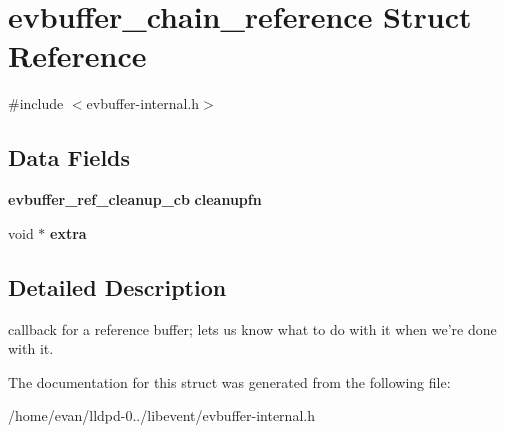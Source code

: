\section{evbuffer\-\_\-chain\-\_\-reference \-Struct \-Reference}
\label{structevbuffer__chain__reference}


{\ttfamily \#include $<$evbuffer-\/internal.\-h$>$}

\subsection*{\-Data \-Fields}
\begin{DoxyCompactItemize}
\item 
{\bf evbuffer\-\_\-ref\-\_\-cleanup\-\_\-cb} {\bfseries cleanupfn}\label{structevbuffer__chain__reference_a2202b563403be4aedf5864efc75ca02d}

\item 
void $\ast$ {\bfseries extra}\label{structevbuffer__chain__reference_a12b7a7182ccbd2e1bc5142e5caafe584}

\end{DoxyCompactItemize}


\subsection{\-Detailed \-Description}
callback for a reference buffer; lets us know what to do with it when we're done with it. 

\-The documentation for this struct was generated from the following file\-:\begin{DoxyCompactItemize}
\item 
/home/evan/lldpd-\/0../libevent/evbuffer-\/internal.\-h\end{DoxyCompactItemize}
